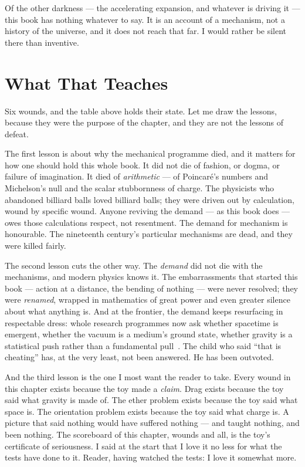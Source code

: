 \documentclass[fontsize=11pt,paper=a4,pagesize=auto,parskip=half-]{scrbook}
\begin{document}
Of the other darkness --- the accelerating expansion, and whatever is driving it --- this book has nothing whatever to say. It is an account of a mechanism, not a history of the universe, and it does not reach that far. I would rather be silent there than inventive.


\section{What That Teaches}

Six wounds, and the table above holds their state. Let me draw the lessons, because they were the purpose of the chapter, and they are not the lessons of defeat.

The first lesson is about why the mechanical programme died, and it matters for how one should hold this whole book. It did not die of fashion, or dogma, or failure of imagination. It died of \emph{arithmetic} --- of Poincaré's numbers and Michelson's null and the scalar stubbornness of charge. The physicists who abandoned billiard balls loved billiard balls; they were driven out by calculation, wound by specific wound. Anyone reviving the demand --- as this book does --- owes those calculations respect, not resentment. The demand for mechanism is honourable. The nineteenth century's particular mechanisms are dead, and they were killed fairly.

The second lesson cuts the other way. The \emph{demand} did not die with the mechanisms, and modern physics knows it. The embarrassments that started this book --- action at a distance, the bending of nothing --- were never resolved; they were \emph{renamed}, wrapped in mathematics of great power and even greater silence about what anything is. And at the frontier, the demand keeps resurfacing in respectable dress: whole research programmes now ask whether spacetime is emergent, whether the vacuum is a medium's ground state, whether gravity is a statistical push rather than a fundamental pull~\cite{verlinde2011}. The child who said ``that is cheating'' has, at the very least, not been answered. He has been outvoted.

And the third lesson is the one I most want the reader to take. Every wound in this chapter exists because the toy made a \emph{claim}. Drag exists because the toy said what gravity is made of. The ether problem exists because the toy said what space is. The orientation problem exists because the toy said what charge is. A picture that said nothing would have suffered nothing --- and taught nothing, and been nothing. The scoreboard of this chapter, wounds and all, is the toy's certificate of seriousness. I said at the start that I love it no less for what the tests have done to it. Reader, having watched the tests: I love it somewhat more.
\end{document}
